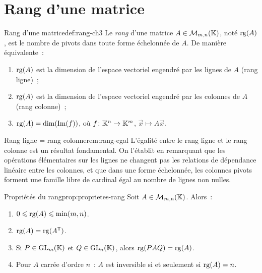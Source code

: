 \section{Rang d'une matrice}\label{sec:rang-ch3}

\begin{definition}{Rang d'une matrice}{def:rang-ch3}
  Le \emph{rang} d'une matrice $A\in\mathcal{M}_{m,n}({\mathbb{K}})$, noté
  $\operatorname{rg}(A)$, est le nombre de pivots dans toute forme échelonnée de $A$.
  De manière équivalente~:
  \begin{enumerate}[label=(\roman*)]
    \item $\operatorname{rg}(A)$ est la dimension de l'espace vectoriel engendré par les
      lignes de $A$ (rang ligne)~;
    \item $\operatorname{rg}(A)$ est la dimension de l'espace vectoriel engendré par les
      colonnes de $A$ (rang colonne)~;
    \item $\operatorname{rg}(A)=\dim(\operatorname{Im}(f))$, où $f\colon{\mathbb{K}}^n\to{\mathbb{K}}^m$,
      $\vec{x}\mapsto A\vec{x}$.
  \end{enumerate}
\end{definition}

\begin{remark}{Rang ligne = rang colonne}{rem:rang-egal}
  L'égalité entre le rang ligne et le rang colonne est un résultat
  fondamental. On l'établit en remarquant que les opérations élémentaires
  sur les lignes ne changent pas les relations de dépendance linéaire entre
  les colonnes, et que dans une forme échelonnée, les colonnes pivots
  forment une famille libre de cardinal égal au nombre de lignes non nulles.
\end{remark}

\begin{proposition}{Propriétés du rang}{prop:proprietes-rang}
  Soit $A\in\mathcal{M}_{m,n}({\mathbb{K}})$. Alors~:
  \begin{enumerate}[label=(\roman*)]
    \item $0\leqslant\operatorname{rg}(A)\leqslant\min(m,n)$.
    \item $\operatorname{rg}(A)=\operatorname{rg}({A}^{\mathsf{T}})$.
    \item Si $P\in\operatorname{GL}_m({\mathbb{K}})$ et $Q\in\operatorname{GL}_n({\mathbb{K}})$, alors $\operatorname{rg}(PAQ)=\operatorname{rg}(A)$.
    \item Pour $A$ carrée d'ordre $n$~: $A$ est inversible si et seulement
      si $\operatorname{rg}(A)=n$.
  \end{enumerate}
\end{proposition}

